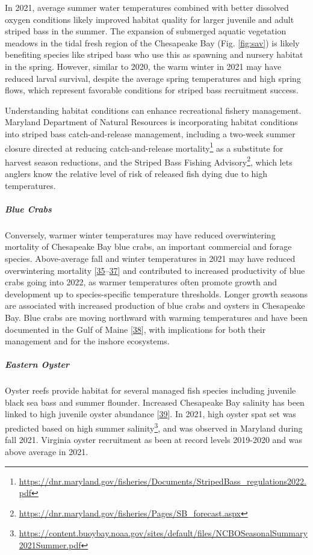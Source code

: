 \documentclass[
  10pt,
]{article}
\begin{document}
In 2021, average summer water temperatures combined with better
dissolved oxygen conditions likely improved habitat quality for larger
juvenile and adult striped bass in the summer. The expansion of
submerged aquatic vegetation meadows in the tidal fresh region of the
Chesapeake Bay (Fig. \ref{fig:sav}) is likely benefiting species like
striped bass who use this as spawning and nursery habitat in the spring.
However, similar to 2020, the warm winter in 2021 may have reduced
larval survival, despite the average spring temperatures and high spring
flows, which represent favorable conditions for striped bass recruitment
success.

Understanding habitat conditions can enhance recreational fishery
management. Maryland Department of Natural Resources is incorporating
habitat conditions into striped bass catch-and-release management,
including a two-week summer closure directed at reducing
catch-and-release mortality\footnote{\url{https://dnr.maryland.gov/fisheries/Documents/StripedBass_regulations2022.pdf}}
as a substitute for harvest season reductions, and the Striped Bass
Fishing Advisory\footnote{\url{https://dnr.maryland.gov/fisheries/Pages/SB_forecast.aspx}},
which lets anglers know the relative level of risk of released fish
dying due to high temperatures.

\hypertarget{blue-crabs}{%
\subparagraph{\texorpdfstring{\emph{Blue
Crabs}}{Blue Crabs}}\label{blue-crabs}}

Conversely, warmer winter temperatures may have reduced overwintering
mortality of Chesapeake Bay blue crabs, an important commercial and
forage species. Above-average fall and winter temperatures in 2021 may
have reduced overwintering mortality
{[}\protect\hyperlink{ref-bauer_temperature-_2010}{35}--\protect\hyperlink{ref-rome_linking_2005}{37}{]}
and contributed to increased productivity of blue crabs going into 2022,
as warmer temperatures often promote growth and development up to
species-specific temperature thresholds. Longer growth seasons are
associated with increased production of blue crabs and oysters in
Chesapeake Bay. Blue crabs are moving northward with warming
temperatures and have been documented in the Gulf of Maine
{[}\protect\hyperlink{ref-johnson_savory_2015}{38}{]}, with implications
for both their management and for the inshore ecosystems.

\hypertarget{eastern-oyster}{%
\subparagraph{\texorpdfstring{\emph{Eastern
Oyster}}{Eastern Oyster}}\label{eastern-oyster}}

Oyster reefs provide habitat for several managed fish species including
juvenile black sea bass and summer flounder. Increased Chesapeake Bay
salinity has been linked to high juvenile oyster abundance
{[}\protect\hyperlink{ref-kimmel_relationship_2014}{39}{]}. In 2021,
high oyster spat set was predicted based on high summer
salinity\footnote{\url{https://content.buoybay.noaa.gov/sites/default/files/NCBOSeasonalSummary2021Summer.pdf}},
and was observed in Maryland during fall 2021. Virginia oyster
recruitment as been at record levels 2019-2020 and was above average in
2021.
\end{document}
